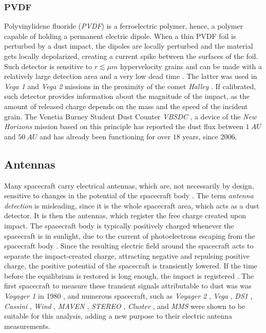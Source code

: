 \subsubsection{PVDF} 

Polyvinylidene fluoride (\textit{PVDF}) is a ferroelectric polymer, hence, a polymer capable of holding a permanent electric dipole. When a thin PVDF foil is perturbed by a dust impact, the dipoles are locally perturbed and the material gets locally depolarized, creating a current spike between the surfaces of the foil. Such detector is sensitive to $r \lesssim \si{\mu m}$ hypervelocity grains and can be made with a relatively large detection area and a very low dead time \citep{tuzzolino1996applications}. The latter was used in \textit{Vega 1} and \textit{Vega 2} missions in the proximity of the comet \textit{Halley} \citep{simpson1988dust}. If calibrated, such detector provides information about the magnitude of the impact, as the amount of released charge depends on the mass and the speed of the incident grain. The Venetia Burney Student Dust Counter \textit{VBSDC} \citep{james2010pvdf}, a device of the \textit{New Horizons} mission based on this principle has reported the dust flux between $\SI{1}{AU}$ and $\SI{50}{AU}$ \citep{bernardoni2022student} and has already been functioning for over $18$ years, since 2006. 

\subsection{Antennas}

Many spacecraft carry electrical antennas, which are, not necessarily by design, sensitive to changes in the potential of the spacecraft body \citep{meyer2017frequency}. The term \textit{antenna detection} is misleading, since it is the whole spacecraft area, which acts as a dust detector. It is then the antennas, which register the free charge created upon impact. The spacecraft body is typically positively charged whenever the spacecraft is in sunlight, due to the current of photoelectrons escaping from the spacecraft body \citep{guillemant2013simulation}. Since the resulting electric field around the spacecraft acts to separate the impact-created charge, attracting negative and repulsing positive charge, the positive potential of the spacecraft is transiently lowered. If the time before the equilibrium is restored is long enough, the impact is registered \citep{mann2019dust}. The first spacecraft to measure these transient signals attributable to dust was was \textit{Voyager 1} in 1980 \citep{scarf1982voyager,aubier1983shot,gurnett1997micron}, and numerous spacecraft, such as \textit{Voyager 2} \citep{gurnett1983micron}, \textit{Vega} \citep{laakso1989impacts}, \textit{DS1} \citep{tsurutani2003dust}, \textit{Cassini} \citep{kurth2006cassini}, \textit{Wind} \citep{malaspina2014interplanetary}, \textit{MAVEN} \citep{andersson2015dust}, \textit{STEREO} \citep{zaslavsky2012interplanetary}, \textit{Cluster} \citep{vaverka2017detection}, and \textit{MMS} \citep{vaverka2018comparison} were shown to be suitable for this analysis, adding a new purpose to their electric antenna measurements. 

